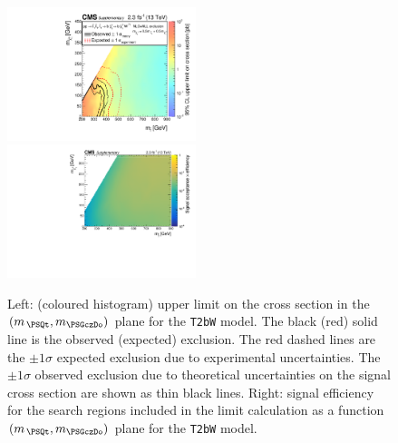 \clearpage
\begin{figure}[!h]
  \begin{center}
    \includegraphics[width=0.49\textwidth]{Supplementary/RA1T2bW-X05XSEC_aux} \, 
    \includegraphics[width=0.49\textwidth]{Supplementary/T2bW_X05_merging_4_cats_aux} \,     
  \end{center}
  \caption{Left: (coloured histogram) upper limit on the cross section in the $(m_{\,\PSQt}, m_{\PSGczDo})$ plane for the \texttt{T2bW} model. 
  The black (red) solid line is the observed (expected) exclusion. The red dashed lines are the $\pm1\sigma$ expected exclusion due to experimental uncertainties. 
  The $\pm1\sigma$ observed exclusion due to theoretical uncertainties on the signal cross section are shown as thin black lines. 
  Right: signal efficiency for the search regions included in the limit calculation as a function $(m_{\,\PSQt}, m_{\PSGczDo})$ plane for the \texttt{T2bW} model. 
  \label{fig:T2bW_X05_excl}}
\end{figure}

